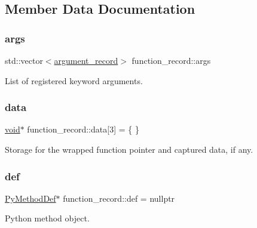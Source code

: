 \subsection{Member Data Documentation}
\mbox{\label{structfunction__record_abc060d33223e10553cb15c879e326ef5}} 
\subsubsection{\texorpdfstring{args}{args}}
{\footnotesize\ttfamily std\+::vector$<$\mbox{\hyperlink{structargument__record}{argument\+\_\+record}}$>$ function\+\_\+record\+::args}



List of registered keyword arguments. 

\mbox{\label{structfunction__record_ada09f0077964b216ba0bf9c12cb6c25f}} 
\subsubsection{\texorpdfstring{data}{data}}
{\footnotesize\ttfamily \mbox{\hyperlink{_s_d_l__opengles2__gl2ext_8h_ae5d8fa23ad07c48bb609509eae494c95}{void}}$\ast$ function\+\_\+record\+::data\mbox{[}3\mbox{]} = \{ \}}



Storage for the wrapped function pointer and captured data, if any. 

\mbox{\label{structfunction__record_a3297bc630d16b17a5559025615390ffa}} 
\subsubsection{\texorpdfstring{def}{def}}
{\footnotesize\ttfamily \mbox{\hyperlink{struct_py_method_def}{Py\+Method\+Def}}$\ast$ function\+\_\+record\+::def = nullptr}



Python method object. 

\mbox{\label{structfunction__record_a01cd5465d0e01d7f0995982b918efed4}} 
